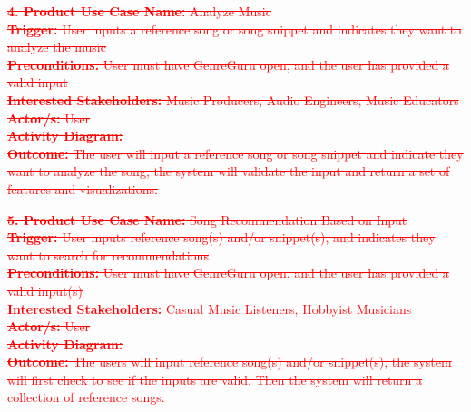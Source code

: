 \documentclass[12pt]{article}
\begin{document}
\vspace{1cm}

\textcolor{red}{\sout{\noindent \textbf{4. Product Use Case Name:} Analyze Music}} \\
\textcolor{red}{\sout{\textbf{Trigger:} User inputs a reference song or song snippet and indicates they want to analyze the music}} \\
\textcolor{red}{\sout{\textbf{Preconditions:} User must have GenreGuru open, and the user has provided a valid input}} \\
\textcolor{red}{\sout{\textbf{Interested Stakeholders:} Music Producers, Audio Engineers, Music Educators}} \\
\textcolor{red}{\sout{\textbf{Actor/s:} User}} \\
\textcolor{red}{\sout{\textbf{Activity Diagram:}}} \\
\textcolor{red}{\sout{\textbf{Outcome:} The user will input a reference song or song snippet and indicate they want to analyze the song, the system will validate the input and return a set of features and visualizations.}}

\vspace{1cm}

\textcolor{red}{\sout{\noindent \textbf{5. Product Use Case Name:} Song Recommendation Based on Input}} \\
\textcolor{red}{\sout{\textbf{Trigger:} User inputs reference song(s) and/or snippet(s), and indicates they want to search for recommendations}} \\
\textcolor{red}{\sout{\textbf{Preconditions:} User must have GenreGuru open, and the user has provided a valid input(s)}} \\
\textcolor{red}{\sout{\textbf{Interested Stakeholders:} Casual Music Listeners, Hobbyist Musicians}} \\
\textcolor{red}{\sout{\textbf{Actor/s:} User}} \\
\textcolor{red}{\sout{\textbf{Activity Diagram:}}} \\
\textcolor{red}{\sout{\textbf{Outcome:} The users will input reference song(s) and/or snippet(s), the system will first check to see if the inputs are valid. Then the system will return a collection of reference songs.}}

\vspace{1cm}
\end{document}
